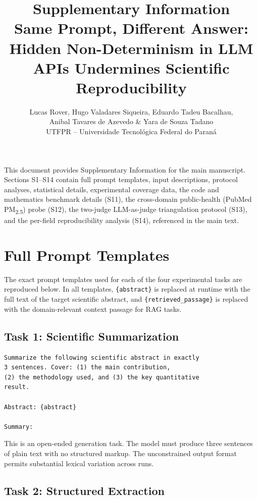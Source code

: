 \documentclass[11pt]{article}
\title{\textbf{Supplementary Information}\\[6pt]
Same Prompt, Different Answer:\\Hidden Non-Determinism in LLM APIs Undermines Scientific Reproducibility}
\author{Lucas Rover, Hugo Valadares Siqueira, Eduardo Tadeu Bacalhau,\\ Anibal Tavares de Azevedo \& Yara de Souza Tadano\\
\small UTFPR -- Universidade Tecnol\'ogica Federal do Paran\'a}
\date{}
\begin{document}
\maketitle

\noindent This document provides Supplementary Information for the main manuscript. Sections S1--S14 contain full prompt templates, input descriptions, protocol analyses, statistical details, experimental coverage data, the code and mathematics benchmark details (S11), the cross-domain public-health (PubMed PM\textsubscript{2.5}) probe (S12), the two-judge LLM-as-judge triangulation protocol (S13), and the per-field reproducibility analysis (S14), referenced in the main text.

\tableofcontents
\newpage


\section{Full Prompt Templates}
\label{sec:s1}

The exact prompt templates used for each of the four experimental tasks are reproduced below. In all templates, \texttt{\{abstract\}} is replaced at runtime with the full text of the target scientific abstract, and \texttt{\{retrieved\_passage\}} is replaced with the domain-relevant context passage for RAG tasks.

\subsection{Task 1: Scientific Summarization}

\begin{lstlisting}[caption={Prompt template for Task 1 (scientific summarization).}]
Summarize the following scientific abstract in exactly
3 sentences. Cover: (1) the main contribution,
(2) the methodology used, and (3) the key quantitative
result.

Abstract: {abstract}

Summary:
\end{lstlisting}

\noindent This is an open-ended generation task. The model must produce three sentences of plain text with no structured markup. The unconstrained output format permits substantial lexical variation across runs.

\subsection{Task 2: Structured Extraction}
\end{document}
